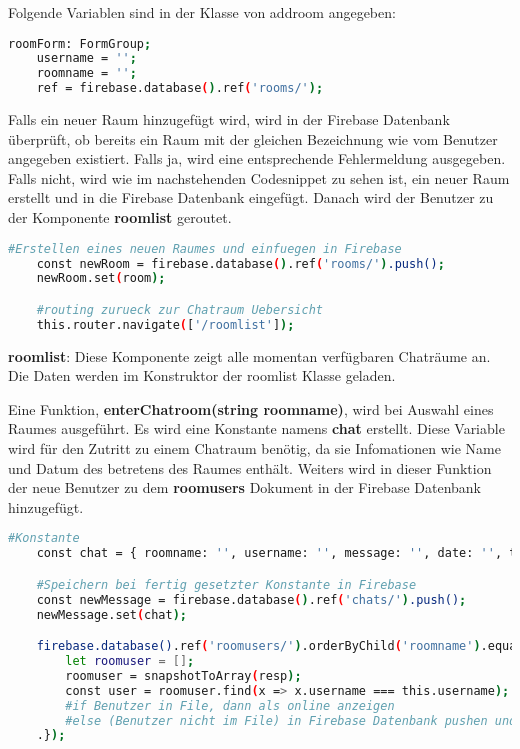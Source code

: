 Folgende Variablen sind in der Klasse von addroom angegeben:
\begin{lstlisting}[language=bash]
    roomForm: FormGroup;
    username = '';
    roomname = '';
    ref = firebase.database().ref('rooms/');
\end{lstlisting}
Falls ein neuer Raum hinzugefügt wird, wird in der Firebase Datenbank überprüft, ob bereits ein Raum mit der gleichen Bezeichnung wie vom Benutzer angegeben existiert. Falls ja, wird eine entsprechende Fehlermeldung ausgegeben. Falls
nicht, wird wie im nachstehenden Codesnippet zu sehen ist, ein neuer Raum erstellt und in die Firebase Datenbank eingefügt. Danach wird der Benutzer zu der Komponente \textbf{roomlist} geroutet.
\begin{lstlisting}[language=bash]
    #Erstellen eines neuen Raumes und einfuegen in Firebase
    const newRoom = firebase.database().ref('rooms/').push();
    newRoom.set(room);

    #routing zurueck zur Chatraum Uebersicht
    this.router.navigate(['/roomlist']);
\end{lstlisting}
\textbf{roomlist}: Diese Komponente zeigt alle momentan verfügbaren Chaträume an. Die Daten werden im Konstruktor der roomlist Klasse geladen.

Eine Funktion, \textbf{enterChatroom(string roomname)}, wird bei Auswahl eines Raumes ausgeführt. Es wird eine Konstante namens \textbf{chat} erstellt. Diese Variable wird für den Zutritt zu einem Chatraum benötig, da sie 
Infomationen wie Name und Datum des betretens des Raumes enthält. Weiters wird in dieser Funktion der neue Benutzer zu dem \textbf{roomusers} Dokument in der Firebase Datenbank hinzugefügt.

\begin{lstlisting}[language=bash]
    #Konstante
    const chat = { roomname: '', username: '', message: '', date: '', type: '' };

    #Speichern bei fertig gesetzter Konstante in Firebase
    const newMessage = firebase.database().ref('chats/').push();
    newMessage.set(chat);

    firebase.database().ref('roomusers/').orderByChild('roomname').equalTo(roomname).on('value', (resp: any) => {
        let roomuser = [];
        roomuser = snapshotToArray(resp);
        const user = roomuser.find(x => x.username === this.username);
        #if Benutzer in File, dann als online anzeigen
        #else (Benutzer nicht im File) in Firebase Datenbank pushen und als online anzeigen
    .});
\end{lstlisting}

